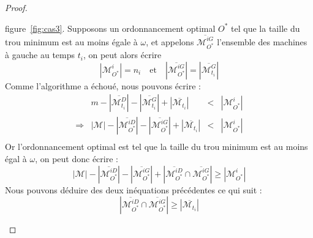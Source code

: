\documentclass[a4paper,9pt]{article}
\begin{document}
\begin{proof}
\begin{bitemize}
\begin{enumerate}
                    figure~\ref{fig:cas3}. 
                    Supposons un ordonnancement optimal $O^*$ tel que la taille du trou minimum est
                    au moins égale à $\omega$, et appelons
                    $\overline{\mathcal{M}_{O^*}^{iG}}$ l'ensemble des machines 
                    à gauche au temps $t_i$, on peut alors écrire
                    \begin{displaymath}
                        |\mathcal{M}_{O^*}^i| = n_i \quad \mbox{et} \quad
                        |\overline{\mathcal{M}_{O^*}^{iG}}| = |\overline{\mathcal{M}_{t_i}^{G}}|
                    \end{displaymath} 
                    Comme l'algorithme a échoué, nous pouvons écrire :
                    \begin{displaymath}
                        \begin{array}{rrcl}
                            & m - |\overline{\mathcal{M}_{t_i}^D}| -
                            |\overline{\mathcal{M}_{t_i}^G}| + |\overline{\mathcal{M}_{t_i}}| & < &
                            |\mathcal{M}_{O^*}^i| \\
                            \Rightarrow & |\mathcal{M}| - |\overline{\mathcal{M}_{O^*}^{iD}}| -
                            |\overline{\mathcal{M}_{O^*}^{iG}}| + |\overline{\mathcal{M}_{t_i}}| & <
                            & |\mathcal{M}_{O^*}^i| \\
                        \end{array}
                    \end{displaymath}
                    Or l'ordonnancement optimal est tel que la taille du trou minimum est au moins
                    égal à $\omega$, on peut donc écrire :
                    \begin{displaymath}
                        |\mathcal{M}| - |\overline{\mathcal{M}_{O^*}^{iD}}| -
                        |\overline{\mathcal{M}_{O^*}^{iG}}| + |\overline{\mathcal{M}_{O^*}^{iD}}
                        \cap \overline{\mathcal{M}_{O^*}^{iG}}|\geq |\mathcal{M}_{O^*}^i|
                    \end{displaymath}
                    Nous pouvons déduire des deux inéquations précédentes ce qui suit :
                    \begin{displaymath}
                        |\overline{\mathcal{M}_{O^*}^{iD}} \cap \overline{\mathcal{M}_{O^*}^{iG}}|
                        \geq |\overline{\mathcal{M}_{t_i}}|
                    \end{displaymath}

\end{enumerate}
\end{bitemize}
\end{proof}
\end{document}
